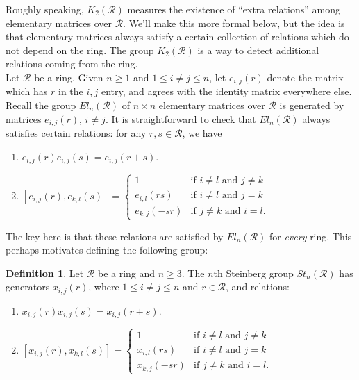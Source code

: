 \documentclass{amsart}
\theoremstyle{definition}
\newtheorem{de}[equation]{Definition}
\theoremstyle{definition}
\newcommand{\calR}{\mathcal{R}}
\numberwithin{equation}{subsection}
\begin{document}
Roughly speaking, $K_{2}(\calR)$ measures the existence of ``extra relations'' among elementary matrices over $\calR$. We'll make this more formal below, but the idea is that elementary matrices always satisfy a certain collection of relations which do not depend on the ring. The group $K_{2}(\calR)$ is a way to detect additional relations coming from the ring.\\

Let $\calR$ be a ring. Given $n \ge 1$ and $1 \le i \ne j \le n$, let $e_{i,j}(r)$ denote the matrix which has $r$ in the $i,j$ entry, and agrees with the identity matrix everywhere else. Recall the group $El_{n}(\calR)$ of $n \times n$ elementary matrices over $\calR$ is generated by matrices $e_{i,j}(r)$, $i \ne j$. It is straightforward to check that $El_{n}(\calR)$ always satisfies certain relations: for any $r, s \in \calR$, we have
\begin{enumerate}
\item
$e_{i,j}(r)e_{i,j}(s) = e_{i,j}(r+s)$.
\item
$[e_{i,j}(r),e_{k,l}(s)] =
\begin{cases}
1 & \mbox{if } i \ne l \mbox{ and } j \ne k\\
e_{i,l}(rs) & \mbox{if } i \ne l \mbox{ and } j = k\\
e_{k,j}(-sr) & \mbox{if } j \ne k \mbox{ and } i = l.
\end{cases}$
\end{enumerate}

The key here is that these relations are satisfied by $El_{n}(\calR)$ for {\it every} ring. This perhaps motivates defining the following group:

\begin{de}
Let $\calR$ be a ring and $n \ge 3$. The $n$th Steinberg group $St_{n}(\calR)$ has generators $x_{i,j}(r)$, where $1 \le i \ne j \le n$ and $r \in \calR$, and relations:
\begin{enumerate}
\item
$x_{i,j}(r)x_{i,j}(s) = x_{i,j}(r+s)$.
\item
$[x_{i,j}(r),x_{k,l}(s)] =
\begin{cases}
1 & \mbox{if } i \ne l \mbox{ and } j \ne k\\
x_{i,l}(rs) & \mbox{if } i \ne l \mbox{ and } j = k\\
x_{k,j}(-sr) & \mbox{if } j \ne k \mbox{ and } i = l.
\end{cases}$
\end{enumerate}
\end{de}
\end{document}
